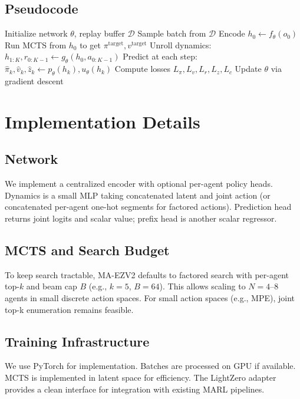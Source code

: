 \documentclass[10pt]{article}
\begin{document}
\subsection{Pseudocode}
\begin{algorithm}[H]
\caption{MA-EZV2 Training Loop}
\begin{algorithmic}[1]
\State Initialize network $\theta$, replay buffer $\mathcal{D}$
    \State Sample batch from $\mathcal{D}$
    \State Encode $h_0 \leftarrow f_\theta(o_0)$
    \State Run MCTS from $h_0$ to get $\pi^{\text{target}}, v^{\text{target}}$
    \State Unroll dynamics: $h_{1:K}, r_{0:K-1} \leftarrow g_\theta(h_0, a_{0:K-1})$
    \State Predict at each step: $\hat{\pi}_k, \hat{v}_k, \hat{z}_k \leftarrow p_\theta(h_k), u_\theta(h_k)$
    \State Compute losses $L_\pi, L_v, L_r, L_z, L_c$
    \State Update $\theta$ via gradient descent
\EndFor
\end{algorithmic}
\end{algorithm}

\section{Implementation Details}
\subsection{Network}
We implement a centralized encoder with optional per-agent policy heads. Dynamics is a small MLP taking concatenated latent and joint action (or concatenated per-agent one-hot segments for factored actions). Prediction head returns joint logits and scalar value; prefix head is another scalar regressor.

\subsection{MCTS and Search Budget}
To keep search tractable, MA-EZV2 defaults to factored search with per-agent top-$k$ and beam cap $B$ (e.g., $k=5$, $B=64$). This allows scaling to $N=4\text{--}8$ agents in small discrete action spaces. For small action spaces (e.g., MPE), joint top-k enumeration remains feasible.

\subsection{Training Infrastructure}
We use PyTorch for implementation. Batches are processed on GPU if available. MCTS is implemented in latent space for efficiency. The LightZero adapter provides a clean interface for integration with existing MARL pipelines.
\end{document}

